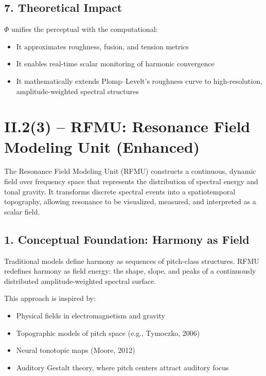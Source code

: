 \documentclass{article}
\begin{document}
\subsection*{7. Theoretical Impact}

$\Phi$ unifies the perceptual with the computational:

\begin{itemize}
    \item It approximates roughness, fusion, and tension metrics
    \item It enables real-time scalar monitoring of harmonic convergence
    \item It mathematically extends Plomp–Levelt’s roughness curve to high-resolution, amplitude-weighted spectral structures
\end{itemize}

\section*{II.2(3) – RFMU: Resonance Field Modeling Unit (Enhanced)}

The Resonance Field Modeling Unit (RFMU) constructs a continuous, dynamic field over frequency space that represents the distribution of spectral energy and tonal gravity. It transforms discrete spectral events into a spatiotemporal topography, allowing resonance to be visualized, measured, and interpreted as a scalar field.

\subsection*{1. Conceptual Foundation: Harmony as Field}

Traditional models define harmony as sequences of pitch-class structures. RFMU redefines harmony as field energy: the shape, slope, and peaks of a continuously distributed amplitude-weighted spectral surface.

This approach is inspired by:

\begin{itemize}
    \item Physical fields in electromagnetism and gravity
    \item Topographic models of pitch space (e.g., Tymoczko, 2006)
    \item Neural tonotopic maps (Moore, 2012)
    \item Auditory Gestalt theory, where pitch centers attract auditory focus
\end{itemize}
\end{document}
